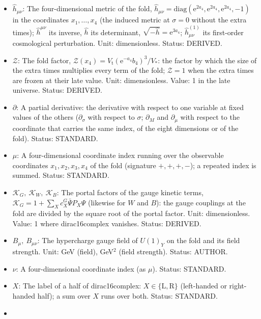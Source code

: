 \documentclass[
  10pt,
]{article}
\providecommand{\tightlist}{%
  \setlength{\itemsep}{0pt}\setlength{\parskip}{0pt}}
\begin{document}
\begin{itemize}
\tightlist
\item
  \(\hat h_{\mu\nu}\): The four-dimensional metric of the fold,
  \(\hat h_{\mu\nu} = \mathrm{diag}(\mathrm{e}^{2a_4}, \mathrm{e}^{2a_4}, \mathrm{e}^{2a_4}, -1)\)
  in the coordinates \(x_1, \dots, x_4\) (the induced metric at
  \(\sigma = 0\) without the extra times); \(\hat h^{\mu\nu}\) its
  inverse, \(\hat h\) its determinant,
  \(\sqrt{-\hat h} = \mathrm{e}^{3a_4}\); \(\hat h^{(1)}_{\mu\nu}\) its
  first-order cosmological perturbation. Unit: dimensionless. Status:
  DERIVED.
\item
  \(\mathcal{Z}\): The fold factor,
  \(\mathcal{Z}(x_4) = V_{\mathrm{t}}(\mathrm{e}^{-a_4}b_4)^3/V_*\): the
  factor by which the size of the extra times multiplies every term of
  the fold; \(\mathcal{Z} = 1\) when the extra times are frozen at their
  late value. Unit: dimensionless. Value: 1 in the late universe.
  Status: DERIVED.
\item
  \(\partial\): A partial derivative: the derivative with respect to one
  variable at fixed values of the others (\(\partial_\sigma\) with
  respect to \(\sigma\); \(\partial_M\) and \(\partial_\mu\) with
  respect to the coordinate that carries the same index, of the eight
  dimensions or of the fold). Status: STANDARD.
\item
  \(\mu\): A four-dimensional coordinate index running over the
  observable coordinates \(x_1, x_2, x_3, x_4\) of the fold (signature
  \(+,+,+,-\)); a repeated index is summed. Status: STANDARD.
\item
  \(\mathcal{K}_{G},\ \mathcal{K}_{W},\ \mathcal{K}_{B}\): The portal
  factors of the gauge kinetic terms,
  \(\mathcal{K}_{G} = 1 + \sum_Xc^{G}_X\bar\Psi P_X\Psi\) (likewise for
  \(W\) and \(B\)): the gauge couplings at the fold are divided by the
  square root of the portal factor. Unit: dimensionless. Value: 1 where
  dirac16complex vanishes. Status: DERIVED.
\item
  \(B_\mu,\ B_{\mu\nu}\): The hypercharge gauge field of \(U(1)_Y\) on
  the fold and its field strength. Unit: GeV (field), GeV\(^2\) (field
  strength). Status: AUTHOR.
\item
  \(\nu\): A four-dimensional coordinate index (as \(\mu\)). Status:
  STANDARD.
\item
  \(X\): The label of a half of dirac16complex:
  \(X \in \{\mathrm{L}, \mathrm{R}\}\) (left-handed or right-handed
  half); a sum over \(X\) runs over both. Status: STANDARD.
\item

\end{itemize}
\end{document}
